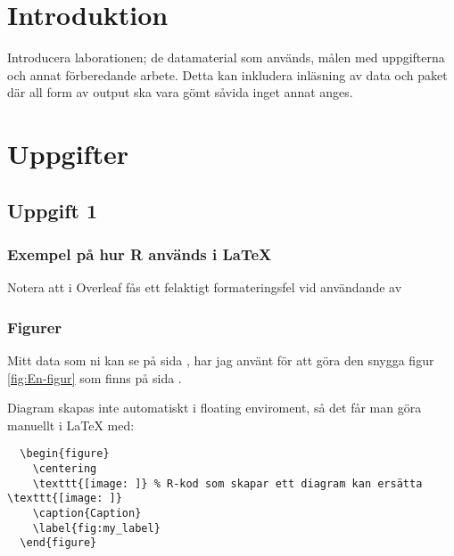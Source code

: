 \documentclass[11pt, openany]{article}
\begin{document}
\mainmatter

\chapter{Introduktion}
Introducera laborationen; de datamaterial som används, målen med uppgifterna och annat förberedande arbete. Detta kan inkludera inläsning av data och paket där all form av output ska vara gömt såvida inget annat anges.


\chapter{Uppgifter}
\section*{Uppgift 1}

\subsection*{Exempel på hur R används i LaTeX}
Notera att i Overleaf fås ett felaktigt formateringsfel vid användande av
\subsection*{Figurer}
Mitt data som ni kan se på sida \pageref{min_data}, har jag använt för att göra den snygga figur \ref{fig:En-figur} som finns på sida \pageref{fig:En-figur}.

Diagram skapas inte automatiskt i floating enviroment, så det får man göra manuellt i LaTeX med: \begin{verbatim}
  \begin{figure}
    \centering
    \texttt{[image: ]} % R-kod som skapar ett diagram kan ersätta \texttt{[image: ]}
    \caption{Caption}
    \label{fig:my_label}
  \end{figure}
\end{verbatim}
\end{document}
